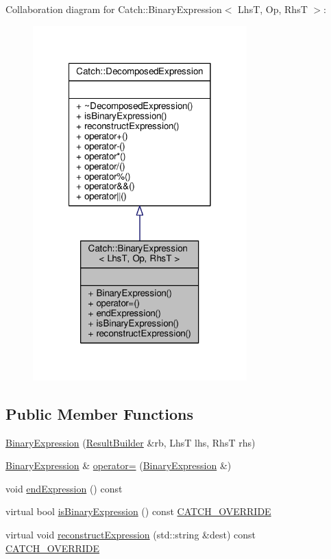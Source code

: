 Collaboration diagram for Catch\-:\-:Binary\-Expression$<$ Lhs\-T, Op, Rhs\-T $>$\-:
\nopagebreak
\begin{figure}[H]
\begin{center}
\leavevmode
\includegraphics[width=234pt]{class_catch_1_1_binary_expression__coll__graph}
\end{center}
\end{figure}
\subsection*{Public Member Functions}
\begin{DoxyCompactItemize}
\item 
\hyperlink{class_catch_1_1_binary_expression_a0d81384761aba5f7a6d5f4fc7e7944f3}{Binary\-Expression} (\hyperlink{class_catch_1_1_result_builder}{Result\-Builder} \&rb, Lhs\-T lhs, Rhs\-T rhs)
\item 
\hyperlink{class_catch_1_1_binary_expression}{Binary\-Expression} \& \hyperlink{class_catch_1_1_binary_expression_a2147a858eb5866e5643d0ef321064aa1}{operator=} (\hyperlink{class_catch_1_1_binary_expression}{Binary\-Expression} \&)
\item 
void \hyperlink{class_catch_1_1_binary_expression_a480b1d75bbac51d1936aec7dad8c1cb1}{end\-Expression} () const 
\item 
virtual bool \hyperlink{class_catch_1_1_binary_expression_a4c617c0b6a73a9cafbbf900909c7c258}{is\-Binary\-Expression} () const \hyperlink{catch_8hpp_a8ecdce4d3f57835f707915ae831eb847}{C\-A\-T\-C\-H\-\_\-\-O\-V\-E\-R\-R\-I\-D\-E}
\item 
virtual void \hyperlink{class_catch_1_1_binary_expression_a6ed73ff9af9c229f9fa3d35d019f9e37}{reconstruct\-Expression} (std\-::string \&dest) const \hyperlink{catch_8hpp_a8ecdce4d3f57835f707915ae831eb847}{C\-A\-T\-C\-H\-\_\-\-O\-V\-E\-R\-R\-I\-D\-E}
\end{DoxyCompactItemize}


